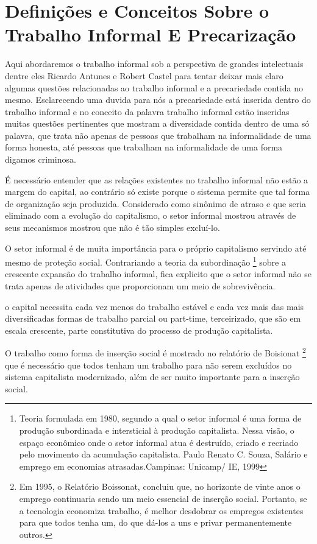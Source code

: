 \chapter{Definições e Conceitos Sobre o Trabalho Informal E Precarização}

Aqui abordaremos o trabalho informal sob a perspectiva de grandes intelectuais dentre eles Ricardo Antunes e Robert Castel para tentar deixar mais claro algumas questões relacionadas ao trabalho informal e a precariedade contida no mesmo. Esclarecendo uma duvida para nós a precariedade está inserida dentro do trabalho informal e no conceito da palavra trabalho informal estão inseridas muitas questões pertinentes que mostram a diversidade contida dentro de uma só palavra, que trata não apenas de pessoas que trabalham na informalidade de uma forma honesta, até pessoas que trabalham na informalidade de uma forma digamos criminosa.

É necessário entender que as relações existentes no trabalho informal não
estão a margem do capital, ao contrário só existe porque o sistema permite que
tal forma de organização seja produzida. Considerado como sinônimo de atraso e
que seria eliminado com a evolução do capitalismo, o setor informal mostrou
através de seus mecanismos mostrou que não é tão simples excluí-lo.

O setor informal é de muita importância para o próprio capitalismo servindo
até mesmo de proteção social. Contrariando a teoria da subordinação \footnote{
Teoria formulada em 1980, segundo a qual o setor informal é uma forma de
produção subordinada e intersticial à produção capitalista. Nessa visão, o
espaço econômico onde o setor informal atua é destruído, criado e recriado
pelo movimento da acumulação capitalista. Paulo Renato C. Souza, Salário e
emprego em economias atrasadas.Campinas: Unicamp/ IE, 1999} sobre a crescente
expansão do trabalho informal, fica explicito que o setor informal não se
trata apenas de atividades que proporcionam um meio de sobrevivência.

\begin{citacao}
o capital necessita cada vez menos do trabalho estável e cada vez mais das mais 
diversificadas formas de trabalho parcial ou part-time, terceirizado, que são em 
escala crescente, parte constitutiva do processo de produção capitalista. \cite{antunes2011modos}
\end{citacao}

O trabalho como forma de inserção social é mostrado no relatório de Boisionat
\footnote{Em 1995, o Relatório Boissonat, concluiu que, no horizonte de vinte
anos o emprego continuaria sendo um meio essencial de inserção social.
Portanto, se a tecnologia economiza trabalho, é melhor desdobrar os empregos
existentes para que todos tenha um, do que dá-los a uns e privar
permanentemente outros.} que é necessário que todos tenham um trabalho para
não serem excluídos no sistema capitalista modernizado, além de ser muito
importante para a inserção social.

